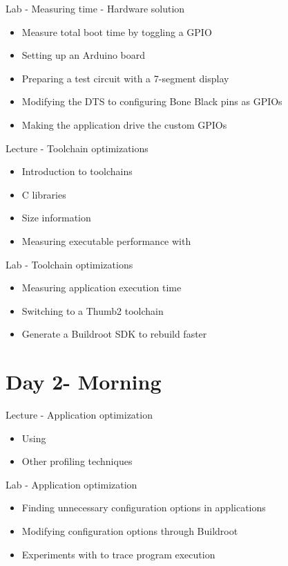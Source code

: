 \documentclass[a4paper,12pt,obeyspaces,spaces,hyphens]{article}
\begin{document}
\feagendatwocolumn
{Lab - Measuring time - Hardware solution}
{
  \begin{itemize}
  \item Measure total boot time by toggling a GPIO
  \item Setting up an Arduino board
  \item Preparing a test circuit with a 7-segment display
  \item Modifying the DTS to configuring Bone Black pins as GPIOs
  \item Making the application drive the custom GPIOs
  \end{itemize}
}
{Lecture - Toolchain optimizations}
{
  \begin{itemize}
  \item Introduction to toolchains
  \item C libraries
  \item Size information
  \item Measuring executable performance with 
  \end{itemize}
}

\feagendaonecolumn
{Lab - Toolchain optimizations}
{
  \begin{itemize}
  \item Measuring application execution time
  \item Switching to a Thumb2 toolchain
  \item Generate a Buildroot SDK to rebuild faster
  \end{itemize}
}

\section{Day 2- Morning}

\feagendatwocolumn
{Lecture - Application optimization}
{
  \begin{itemize}
  \item Using 
  \item Other profiling techniques
  \end{itemize}
}
{Lab - Application optimization}
{
 \begin{itemize}
 \item Finding unnecessary configuration options in applications
 \item Modifying configuration options through Buildroot
 \item Experiments with  to trace program execution
 \end{itemize}
}
\end{document}
